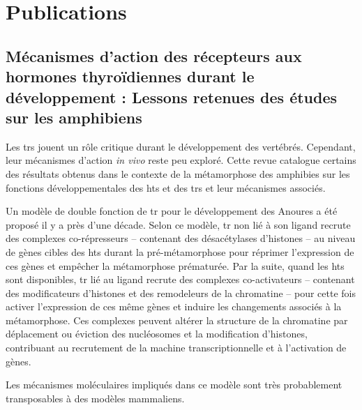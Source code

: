 \documentclass[../main.tex]{subfiles}
\begin{document}
\chapter{Publications}\label{chap:publications}

\clearpage
\newpage


\glsresetall
\section{Mécanismes d'action des récepteurs aux hormones thyroïdiennes durant le développement : Lessons retenues des études sur les amphibiens}\label{sec:bba-review}

\begin{abstractfr}
Les \glspl{tr} jouent un rôle critique durant le développement des vertébrés.
Cependant, leur mécanismes d'action \textit{in vivo} reste peu exploré.
Cette revue catalogue certains des résultats obtenus dans le contexte de la métamorphose des amphibies sur les fonctions développementales des \glspl{ht} et des \glspl{tr} et leur mécanismes associés.
\par
Un modèle de double fonction de \gls{tr} pour le développement des Anoures a été proposé il y a près d'une décade.
Selon ce modèle, \gls{tr} non lié à son ligand recrute des complexes co-répresseurs – contenant des désacétylases d'histones – au niveau de gènes cibles des \glspl{ht} durant la pré-métamorphose pour réprimer l'expression de ces gènes et empêcher la métamorphose prématurée.
Par la suite, quand les \glspl{ht} sont disponibles, \gls{tr} lié au ligand recrute des complexes co-activateurs – contenant des modificateurs d'histones et des remodeleurs de la chromatine – pour cette fois activer l'expression de ces même gènes et induire les changements associés à la métamorphose.
Ces complexes peuvent altérer la structure de la chromatine par déplacement ou éviction des nucléosomes et la modification d'histones, contribuant au recrutement de la machine transcriptionnelle et à l'activation de gènes.
\par
Les mécanismes moléculaires impliqués dans ce modèle sont très probablement transposables à des modèles mammaliens.
\end{abstractfr}



\end{document}
